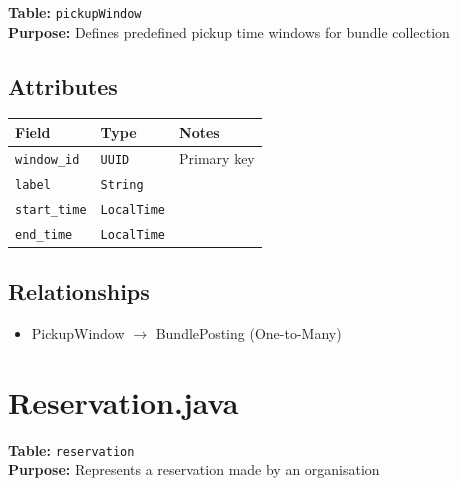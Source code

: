 \documentclass[a4paper,11pt]{article}
\begin{document}
\textbf{Table:} \texttt{pickupWindow} \\
\textbf{Purpose:} Defines predefined pickup time windows for bundle collection \\

\subsection*{Attributes}
\begin{longtable}{|p{4cm}|p{3cm}|p{6cm}|}
\hline
\textbf{Field} & \textbf{Type} & \textbf{Notes} \\
\hline
\texttt{window\_id} & \texttt{UUID} & Primary key \\
\texttt{label} & \texttt{String} &  \\
\texttt{start\_time} & \texttt{LocalTime} &  \\
\texttt{end\_time} & \texttt{LocalTime} &  \\
\hline
\end{longtable}

\subsection*{Relationships}
\begin{itemize}
  \item PickupWindow $\rightarrow$ BundlePosting (One-to-Many)

\end{itemize}



\section{Reservation.java}

\textbf{Table:} \texttt{reservation} \\
\textbf{Purpose:} Represents a reservation made by an organisation  \\
\end{document}
